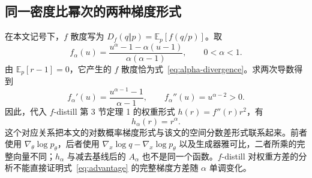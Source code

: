 \documentclass[UTF8,fontset=none,11pt,a4paper]{ctexart}
\newcommand{\E}{\mathbb E}
\begin{document}
\subsection{同一密度比幂次的两种梯度形式}
在本文记号下，$f$ 散度写为 $D_f(q\Vert p)=\E_p[f(q/p)]$。取
\[
f_\alpha(u)
=\frac{u^\alpha-1-\alpha(u-1)}{\alpha(\alpha-1)},
\qquad 0<\alpha<1.
\]
由 $\E_p[r-1]=0$，它产生的 $f$ 散度恰为式~\eqref{eq:alpha-divergence}。求两次导数得到
\[
f_\alpha'(u)=\frac{u^{\alpha-1}-1}{\alpha-1},
\qquad
f_\alpha''(u)=u^{\alpha-2}>0.
\]
因此，代入 $f$-distill 第 3 节定理 1 的权重形式 $h(r)=f''(r)r^2$，有
\[
h_\alpha(r)=r^\alpha.
\]
这个对应关系把本文的对数概率梯度形式与该文的空间分数差形式联系起来。前者使用 $\nabla_\theta\log p_\theta$，后者使用 $\nabla_x\log q-\nabla_x\log p_\theta$ 以及生成器雅可比，二者所乘的完整向量不同；$h_\alpha$ 与减去基线后的 $A_\alpha$ 也不是同一个函数。$f$-distill 对权重方差的分析不能直接证明式~\eqref{eq:advantage} 的完整梯度方差随 $\alpha$ 单调变化\cite{xu2025}。

\printbibliography[title={参考文献}]
\end{document}
